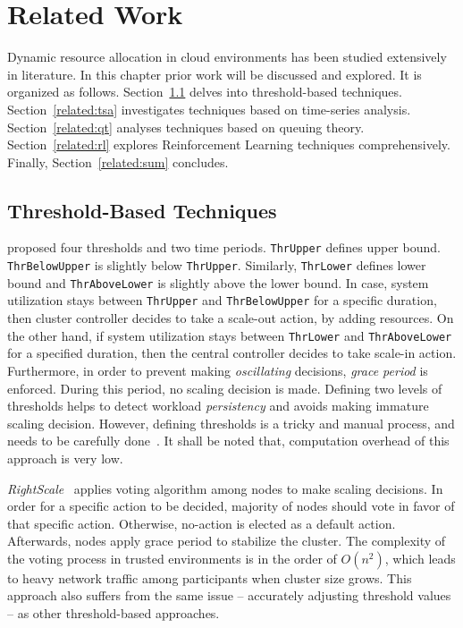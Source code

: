\chapter{Related Work}
\label{related}
Dynamic resource allocation in cloud environments has been studied extensively in literature. In this chapter prior work will be discussed and explored. It is organized as follows. Section~\ref{related:thb} delves into threshold-based techniques. Section~\ref{related:tsa} investigates techniques based on time-series analysis. Section~\ref{related:qt} analyses techniques based on queuing theory. Section~\ref{related:rl} explores Reinforcement Learning techniques comprehensively. Finally, Section~\ref{related:sum} concludes.

\section{Threshold-Based Techniques}
\label{related:thb}

\textcite{Hasan2012IntegratedAA} proposed four thresholds and two time periods. \lstinline$ThrUpper$ defines upper bound. \lstinline$ThrBelowUpper$ is slightly below \lstinline$ThrUpper$. Similarly, \lstinline$ThrLower$ defines lower bound and \lstinline$ThrAboveLower$ is slightly above the lower bound. In case, system utilization stays between \lstinline$ThrUpper$ and \lstinline$ThrBelowUpper$ for a specific duration, then cluster controller decides to take a scale-out action, by adding resources. On the other hand, if system utilization stays between \lstinline$ThrLower$ and \lstinline$ThrAboveLower$ for a specified duration, then the central controller decides to take scale-in action. Furthermore, in order to prevent making \emph{oscillating} decisions, \emph{grace period} is enforced. During this period, no scaling decision is made. Defining two levels of thresholds helps to detect workload \emph{persistency} and avoids making immature scaling decision. However, defining thresholds is a tricky and manual process, and needs to be carefully done~\cite{Dutreilh2010}. It shall be noted that, computation overhead of this approach is very low.

\emph{RightScale}~\cite{RightScale} applies voting algorithm among nodes to make scaling decisions. In order for a specific action to be decided, majority of nodes should vote in favor of that specific action. Otherwise, no-action is elected as a default action. Afterwards, nodes apply grace period to stabilize the cluster. The complexity of the voting process in trusted environments is in the order of $O(n^2)$, which leads to heavy network traffic among participants when cluster size grows. This approach also suffers from the same issue -- accurately adjusting threshold values -- as other threshold-based approaches.

